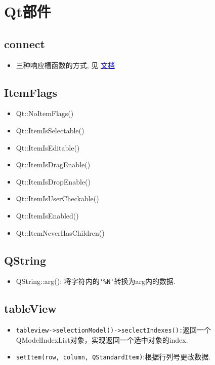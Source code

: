 \documentclass[11pt]{article}
\begin{document}
\tableofcontents

\thispagestyle{empty}
\newpage
\setcounter{page}{1}
\section{Qt部件}
\subsection{connect}
\begin{itemize}

\item 三种响应槽函数的方式, 见
\href{https://doc.qt.io/qt-6/qobject.html#connect}{
\textcolor{blue}{文档}}
\end{itemize}




\subsection{ItemFlags}
\begin{itemize}
\item Qt::NoItemFlags()
\item Qt::ItemIsSelectable()
\item Qt::ItemIsEditable()
\item Qt::ItemIsDragEnable()
\item Qt::ItemIsDropEnable()
\item Qt::ItemIsUserCheckable()
\item Qt::ItemIsEnabled()
\item Qt::ItemNeverHasChildren()
\end{itemize}


\subsection{QString}
\begin{itemize}
\item QString::arg(): 将字符内的\verb|'%N'|转换为arg内的数据.
\end{itemize}




\subsection{tableView}
\begin{itemize}
\item \verb|tableview->selectionModel()->seclectIndexes():|返回一个QModelIndexList对象，实现返回一个选中对象的index.
\item \verb|setItem(row, column, QStandardItem)|:根据行列号更改数据.
\end{itemize}
\end{document}
